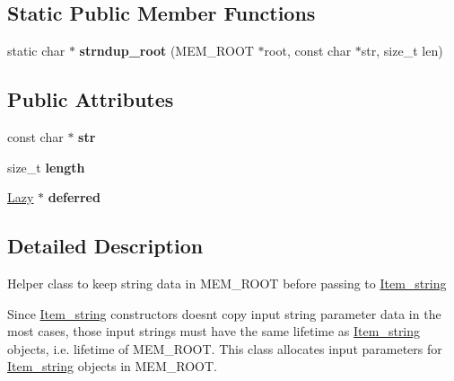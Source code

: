 \subsection*{Static Public Member Functions}
\begin{DoxyCompactItemize}
\item 
\mbox{\label{structqep__row_1_1mem__root__str_ace967272a6eb8a4fda1376ab1f4393b2}} 
static char $\ast$ {\bfseries strndup\+\_\+root} (M\+E\+M\+\_\+\+R\+O\+OT $\ast$root, const char $\ast$str, size\+\_\+t len)
\end{DoxyCompactItemize}
\subsection*{Public Attributes}
\begin{DoxyCompactItemize}
\item 
\mbox{\label{structqep__row_1_1mem__root__str_ad05696effed1f972048fa04aa225b5ee}} 
const char $\ast$ {\bfseries str}
\item 
\mbox{\label{structqep__row_1_1mem__root__str_a1efdc5217d42198eb47575f99ce01b2a}} 
size\+\_\+t {\bfseries length}
\item 
\mbox{\label{structqep__row_1_1mem__root__str_aa1be5ef3f725aa64734125ad77049021}} 
\mbox{\hyperlink{classLazy}{Lazy}} $\ast$ {\bfseries deferred}
\end{DoxyCompactItemize}


\subsection{Detailed Description}
Helper class to keep string data in M\+E\+M\+\_\+\+R\+O\+OT before passing to \mbox{\hyperlink{classItem__string}{Item\+\_\+string}}

Since \mbox{\hyperlink{classItem__string}{Item\+\_\+string}} constructors doesn\textquotesingle{}t copy input string parameter data in the most cases, those input strings must have the same lifetime as \mbox{\hyperlink{classItem__string}{Item\+\_\+string}} objects, i.\+e. lifetime of M\+E\+M\+\_\+\+R\+O\+OT. This class allocates input parameters for \mbox{\hyperlink{classItem__string}{Item\+\_\+string}} objects in M\+E\+M\+\_\+\+R\+O\+OT.

